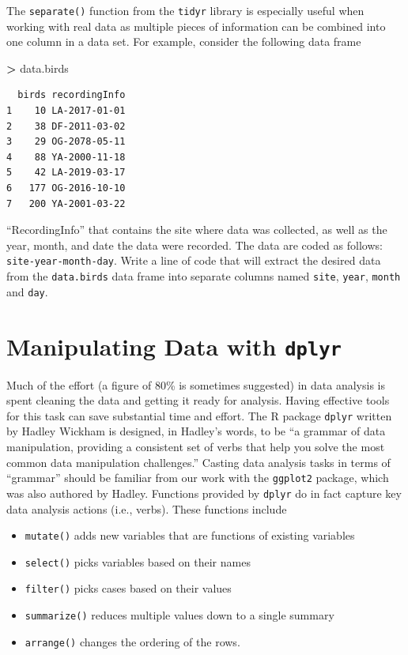 \documentclass[
]{krantz}
\makeatletter
\newenvironment{Shaded}{\begin{snugshade}}{\end{snugshade}}
\newcommand{\NormalTok}[1]{#1}
\newcommand{\OperatorTok}[1]{\textcolor[rgb]{0.43,0.43,0.43}{\textbf{#1}}}
\newcommand{\StringTok}[1]{\textcolor[rgb]{0.5,0.5,0.5}{#1}}
\providecommand{\tightlist}{%
  \setlength{\itemsep}{0pt}\setlength{\parskip}{0pt}}
\newenvironment{kframe}{%
\medskip{}
\setlength{\fboxsep}{.8em}
 \def\at@end@of@kframe{}%
 \ifinner\ifhmode%
  \def\at@end@of@kframe{\end{minipage}}%
  \begin{minipage}{\columnwidth}%
 \fi\fi%
 \def\FrameCommand##1{\hskip\@totalleftmargin \hskip-\fboxsep
 \colorbox{shadecolor}{##1}\hskip-\fboxsep
     \hskip-\linewidth \hskip-\@totalleftmargin \hskip\columnwidth}%
 \MakeFramed {\advance\hsize-\width
   \@totalleftmargin\z@ \linewidth\hsize
   \@setminipage}}%
 {\par\unskip\endMakeFramed%
 \at@end@of@kframe}
\renewenvironment{Shaded}{\begin{kframe}}{\end{kframe}}
\makeatother
\begin{document}
The \texttt{separate()} function from the \texttt{tidyr} library is especially useful when working with real data as multiple pieces of information can be combined into one column in a data set. For example, consider the following data frame

\begin{Shaded}
\begin{Highlighting}[]
\OperatorTok{\textgreater{}}\StringTok{ }\NormalTok{data.birds}
\end{Highlighting}
\end{Shaded}

\begin{verbatim}
  birds recordingInfo
1    10 LA-2017-01-01
2    38 DF-2011-03-02
3    29 OG-2078-05-11
4    88 YA-2000-11-18
5    42 LA-2019-03-17
6   177 OG-2016-10-10
7   200 YA-2001-03-22
\end{verbatim}

``RecordingInfo'' that contains the site where data was collected, as well as the year, month, and date the data were recorded. The data are coded as follows: \texttt{site-year-month-day}. Write a line of code that will extract the desired data from the \texttt{data.birds} data frame into separate columns named \texttt{site}, \texttt{year}, \texttt{month} and \texttt{day}.

\hypertarget{dplyr}{%
\section{\texorpdfstring{Manipulating Data with \texttt{dplyr}}{Manipulating Data with dplyr}}\label{dplyr}}

Much of the effort (a figure of 80\% is sometimes suggested) in data analysis is spent cleaning the data and getting it ready for analysis. Having effective tools for this task can save substantial time and effort. The R package \texttt{dplyr} written by Hadley Wickham is designed, in Hadley's words, to be ``a grammar of data manipulation, providing a consistent set of verbs that help you solve the most common data manipulation challenges.'' Casting data analysis tasks in terms of ``grammar'' should be familiar from our work with the \texttt{ggplot2} package, which was also authored by Hadley. Functions provided by \texttt{dplyr} do in fact capture key data analysis actions (i.e., verbs). These functions include

\begin{itemize}
\tightlist
\item
  \texttt{mutate()} adds new variables that are functions of existing variables
\item
  \texttt{select()} picks variables based on their names
\item
  \texttt{filter()} picks cases based on their values
\item
  \texttt{summarize()} reduces multiple values down to a single summary
\item
  \texttt{arrange()} changes the ordering of the rows.
\end{itemize}
\end{document}
